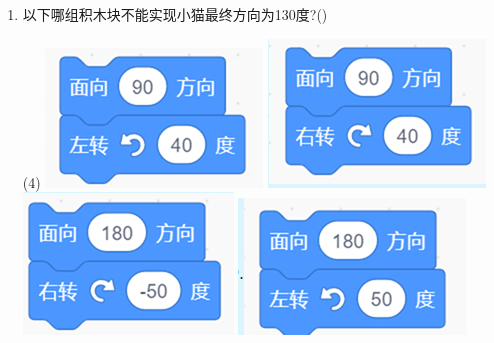 \documentclass[10pt, a4paper]{article}
\begin{document}
\begin{enumerate}
        \item 以下哪组积木块不能实现小猫最终方向为130度?(\qquad)
        \begin{tasks}(4)
            \task \includegraphics[width=.12\textwidth]{4a.png}
            \task \includegraphics[width=.12\textwidth]{4b.png}
            \task \includegraphics[width=.12\textwidth]{4c.png}
            \task \includegraphics[width=.14\textwidth]{4d.png}
        \end{tasks}


\end{enumerate}
\end{document}
